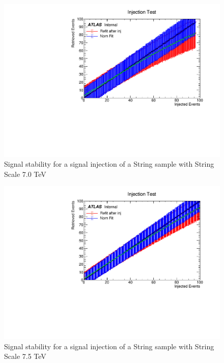 \begin{figure}
    \centering
    \includegraphics[trim={0cm 0cm 1.6cm 1cm},clip,width=1.0\linewidth]{figures/app-GlobalFitStability/injectionFitStabilityStringScale7000.pdf}
    \caption{Signal stability for a signal injection of a String sample with String Scale 7.0 TeV}
    \label{fig:StringSignalInjectionFitStabilityStudyMs7.0TeV}
\end{figure}
\begin{figure}
    \centering
    \includegraphics[trim={0cm 0cm 1.6cm 1cm},clip,width=1.0\linewidth]{figures/app-GlobalFitStability/injectionFitStabilityStringScale7500.pdf}
    \caption{Signal stability for a signal injection of a String sample with String Scale 7.5 TeV}
\end{figure}
